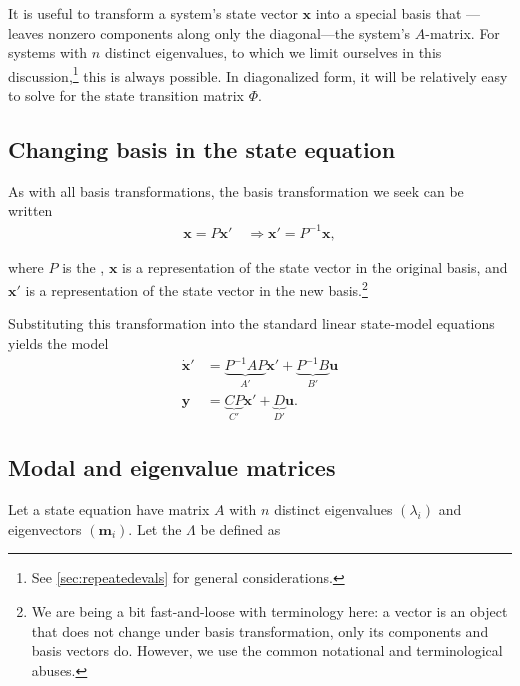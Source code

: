 \documentclass[dynamic_systems.tex]{subfiles}
\begin{document}
It is useful to transform a system's state vector $\bm{x}$ into a special basis that ---leaves nonzero components along only the diagonal---the system's $A$-matrix.
For systems with $n$ distinct eigenvalues, to which we limit ourselves in this discussion,\footnote{See \autoref{sec:repeatedevals} for general considerations.} this is always possible.
In diagonalized form, it will be relatively easy to solve for the state transition matrix $\Phi$.
\tags{}

\subsection{Changing basis in the state equation}
\tags{}

As with all basis transformations, the basis transformation we seek can be written
\begin{align}
	\bm{x} = P \bm{x}' \quad \Rightarrow
	\bm{x}' = P^{-1} \bm{x},
\end{align}

where $P$ is the , $\bm{x}$ is a representation of the state vector in the original basis, and $\bm{x}'$ is a representation of the state vector in the new basis.\footnote{We are being a bit fast-and-loose with terminology here: a vector is an object that does not change under basis transformation, only its components and basis vectors do. However, we use the common notational and terminological abuses.}
\tags{}

Substituting this transformation into the standard linear state-model equations yields the model
\tags{}
\begin{subequations}
\begin{align}
	\dot{\bm{x}}' &= 
	\underbrace{P^{-1} A P}_{A'} \bm{x}' +
	\underbrace{P^{-1} B}_{B'} \bm{u} \\
	\bm{y} &=
	\underbrace{C P}_{C'} \bm{x}' +
	\underbrace{D}_{D'} \bm{u}.
\end{align}
\end{subequations}

\subsection{Modal and eigenvalue matrices}
\tags{}

Let a state equation have matrix $A$ with $n$ distinct eigenvalues $(\lambda_i)$ and eigenvectors $(\bm{m}_i)$.
Let the  $\Lambda$ be defined as
\tags{}
\end{document}
